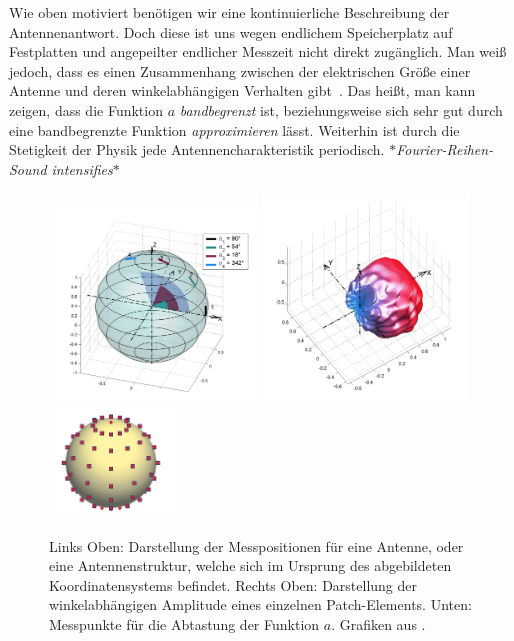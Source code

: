 Wie oben motiviert ben\"otigen wir eine kontinuierliche Beschreibung der Antennenantwort. Doch diese ist uns wegen endlichem Speicherplatz auf Festplatten und angepeilter endlicher Messzeit nicht direkt zug\"anglich. Man wei{\ss} jedoch, dass es einen Zusammenhang zwischen der elektrischen Gr\"o{\ss}e einer Antenne und deren winkelabh\"angigen Verhalten gibt~\cite[Kapitel~4]{delgaldo2007phd}. Das hei{\ss}t, man kann zeigen, dass die Funktion $a$ \emph{bandbegrenzt} ist, beziehungsweise sich sehr gut durch eine bandbegrenzte Funktion \emph{approximieren} l\"asst. Weiterhin ist durch die Stetigkeit der Physik jede Antennencharakteristik periodisch. \emph{$\ast$Fourier-Reihen-Sound intensifies$\ast$}

\begin{figure}[t]
    \centering\includegraphics[width=0.49\textwidth]{img/eadf/measure.png}
    \includegraphics[width=0.49\textwidth]{img/eadf/3d_bp.png}
    \includegraphics[width=0.3\textwidth]{img/eadf/bp_sampling.png}
    \caption{Links Oben: Darstellung der Messpositionen f\"ur eine Antenne, oder eine Antennenstruktur, welche sich im Ursprung des abgebildeten Koordinatensystems befindet. Rechts Oben: Darstellung der winkelabh\"angigen Amplitude eines einzelnen Patch-Elements. Unten: Messpunkte f\"ur die Abtastung der Funktion $a$. Grafiken aus \cite{landmann2004EADF,delgaldo2007phd}.}\label{eadf_meas}
\end{figure}


